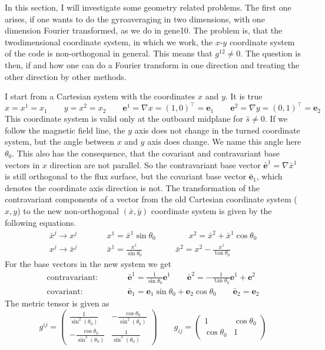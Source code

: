 \documentclass[12pt]{report}
\begin{document}
In this section, I will investigate some geometry related
problems. The first one arises, if one wants to do the gyroaveraging
in two dimensions, with one dimension Fourier transformed, as we do in
gene10. The problem is, that the twodimensional coordinate system, in
which we work, the $x$-$y$ coordinate system of the code is
non-orthogonal in general. This means that $g^{12}\neq0$. The question
is then, if and how one can do a Fourier transform in one direction and
treating the other direction by other methods. 

I start from a Cartesian system with the coordinates $x$ and $y$. It
is true
\begin{displaymath}
  x=x^1=x_1\qquad
  y=x^2=x_2\qquad
  \mathbf{e}^1=\nabla x = (1,0)^\top=\mathbf{e}_1\qquad
  \mathbf{e}^2=\nabla y = (0,1)^\top=\mathbf{e}_2
\end{displaymath}
This coordinate system is valid only at the outboard midplane for
$\hat{s}\neq0$. If we follow the magnetic field line, the $y$ axis
does not change in the turned coordinate system, but the angle between
$x$ and $y$ axis does change. We name this angle here $\theta_0$. This
also has the consequence, that the covariant and contravariant base
vectors in $x$ direction are not parallel. So the contravariant base
vector $\mathbf{\bar e}^1=\nabla \bar x^1$ is still orthogonal to the
flux surface, but the covariant base vector $\mathbf{\bar e}_1$, which
denotes the coordinate axis direction is not. The transformation of the
contravariant components of a vector from the old Cartesian coordinate system
($x,y$) to the new non-orthogonal $(\bar x,\bar y)$ coordinate system is given by the
following equations.
\begin{eqnarray*}
  \bar x^j\longrightarrow x^j &\qquad& x^1=\bar x^1\sin\theta_0\qquad\qquad
  x^2=\bar x^2 + \bar x^1\cos\theta_0\\
  x^j \longrightarrow \bar x^j &\qquad&  \bar x^1=\frac{x^1}{\sin\theta_0}\qquad\qquad
  \bar x^2 = x^2-\frac{x^1}{\tan\theta_0}
\end{eqnarray*}
For the base vectors in the new system we get
\begin{eqnarray*}
  \mbox{contravariant:}&&\qquad\mathbf{\bar e}^1=\frac{1}{\sin\theta_0}\mathbf{e}^1\qquad
  \mathbf{\bar e}^2=-\frac{1}{\tan\theta_0}\mathbf{e}^1+\mathbf{e}^2\\
  \mbox{covariant:}&&\qquad\mathbf{\bar e}_1=\mathbf{e}_1\sin\theta_0+\mathbf{e}_2\cos\theta_0\qquad
  \mathbf{\bar e}_2=\mathbf{e}_2
\end{eqnarray*}
The metric tensor is given as
\begin{displaymath}
  g^{ij}=\left(
\begin{array}{ll}
  \frac{1}{\sin^2(\theta_0)} & -\frac{\cos\theta_0}{\sin^2(\theta_0)} \\
 -\frac{\cos\theta_0}{\sin^2(\theta_0)} & \frac{1}{\sin^2(\theta_0)}
\end{array}
\right)\qquad
  g_{ij}=\left(
    \begin{array}{cc}
      1 & \cos\theta_0\\
      \cos\theta_0 & 1
    \end{array}\right)
\end{displaymath}
\end{document}
